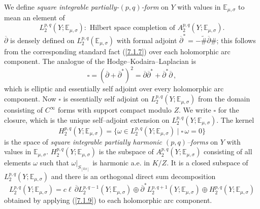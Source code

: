 \documentclass{conm-p-l}
\def\E{\mathbb{E}}
\begin{document}
We define {\em square integrable partially-{$(p,q)$}-form} on $Y$ with
values in $\E_{\mu,\sigma}$ to mean an element of 
\begin{equation}\label{8.1.8}
L_2^{p,q}(Y;\E_{\mu,\sigma}): \text{ Hilbert
	space completion of } A_2^{p,q}(Y;\E_{\mu,\sigma}).
\end{equation}
$\overline{\partial}$ is densely defined on $L_2^{p,q}(\E_{\mu,\sigma})$
with formal adjoint $\overline{\partial}^* = - \widetilde{\#}\overline{\partial}
\#$; this follows from the corresponding standard fact (\ref{7.1.7}) over each
holomorphic arc component.  The analogue of the Hodge--Kodaira--Laplacian
is
\begin{equation}\label{8.1.8a}
\square = (\overline{\partial} +
	\overline{\partial}^*)^2 = \overline{\partial}\overline{\partial}^*
	+ \overline{\partial}^*\overline{\partial}\,, 
\end{equation}
which is elliptic and essentially self adjoint over every holomorphic
arc component.  Now $\square$ is essentially self adjoint on
$L_2^{p,q}(Y;\E_{\mu,\sigma})$ from the domain consisting of $C^\infty$ 
forms with
support compact modulo $Z$.  We write $\square$ for the closure, which is the
unique self--adjoint extension on $L_2^{p,q}(Y;\E_{\mu,\sigma})$.  The kernel
\begin{equation}\label{8.1.8b}
H_2^{p,q}(Y;\E_{\mu,\sigma}) = \{\omega \in L_2^{p,q}(Y;\E_{\mu,\sigma}) \mid
	\square\,\omega = 0\}
\end{equation}
is the space of {\em square integrable partially harmonic $(p,q)$--forms}
on $Y$ with values in $\E_{\mu,\sigma}$.  $H_2^{p,q}(Y;\E_{\mu,\sigma})$ is the
subspace of $A_2^{p,q}(Y;\E_{\mu,\sigma})$ consisting of all elements $\omega$ 
such that $\omega|_{S_{[kx]}}$ is harmonic a.e. in $K/Z$.  It is a closed
subspace of $L_2^{p,q}(Y;\E_{\mu,\sigma})$ and there is an orthogonal
direct sum decomposition 
\begin{equation}\label{8.1.8c}
L_2^{p,q}(Y;\E_{\mu,\sigma}) = 
     c\ell\, \overline{\partial}L_2^{p,q-1}(Y;\E_{\mu,\sigma}) \oplus
	\overline{\partial}^*L_2^{p,q+1}(Y;\E_{\mu,\sigma}) \oplus
	H_2^{p,q}(Y;\E_{\mu,\sigma})
\end{equation}
obtained by applying (\ref{7.1.9}) to each holomorphic arc component.
\end{document}
